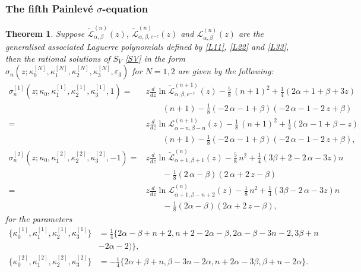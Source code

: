 \documentclass[12pt]{article}
\def\P{Painlev\'e }
\def\L{\mathcal{L}}
\newtheorem{mydef}{Theorem}[section]
\numberwithin{figure}{section}
\numberwithin{equation}{section}
\numberwithin{table}{section}
\begin{document}
\subsubsection{The fifth \P $\sigma$-equation}
\begin{mydef}
Suppose $\widetilde{\L}_{\alpha,\beta}^{(n)}(z)$, $\widetilde{\L}_{\alpha,\beta,e^{-z}}^{(n)}(z)$ and ${\L}_{\alpha,\beta}^{(n)}(z)$ are the generalised associated Laguerre polynomials defined by \eqref{L11}, \eqref{L22} and \eqref{L33}, then the rational solutions of $S_{V}$ \eqref{SV} in the form $\sigma_n(z;\kappa_0^{[N]},\kappa_1^{[N]},\kappa_2^{[N]},\kappa_3^{[N]},\varepsilon_3)$ for $N=1,2$ are given by the following:
\begin{subequations}
\begin{align}\nonumber
\sigma_n^{[1]}(z;\kappa_0,\kappa_1^{[1]},\kappa_2^{[1]},\kappa_3^{[1]},1)=&z\frac{d}{dz}\ln\mathcal{\widetilde L}_{\alpha,\beta,e^{-z}}^{(n+1)}(z)-\tfrac{5}{8}\,{(n+1)}^{2}+
\tfrac{1}{4}\left(2\alpha+1+\beta+3z\right)\\\nonumber&\qquad
(n+1)-\tfrac{1}{8}\left( -2\,\alpha-1+\beta \right)  \left( -2\,\alpha-1-2\,z+\beta\right)\\\nonumber
=&z\frac{d}{dz}\ln\mathcal{L}_{\alpha-n,\beta-n}^{(n+1)}(z)-\tfrac{1}{8}\,{(n+1)}^{2}+ \tfrac{1}{4}\left(2\alpha-1+\beta-z\right)\\\nonumber&\qquad
(n+1)-\tfrac{1}{8}\left( -2\,\alpha-1+\beta \right)  \left( -2\,\alpha-1-2\,z+\beta\right),\\\nonumber
\sigma_n^{[2]}(z;\kappa_0,\kappa_1^{[2]},\kappa_2^{[2]},\kappa_3^{[2]},-1)
=&z\frac{d}{dz}\ln\mathcal{\widetilde L}_{\alpha+1,\beta+1}^{(n)}(z)-\tfrac{5}{8}\,{n}^{2}+\tfrac{1}{4}\left(3\beta+2-2\,\alpha-3z\right) n\\\nonumber&\qquad
-\tfrac{1}{8}\left( 2\,\alpha-\beta \right)  \left( 2\,\alpha+2\,z-\beta\right)\\\nonumber
=&z\frac{d}{dz}\ln\mathcal{L}_{\alpha+1,\beta-n+2}^{(n)}(z)-\tfrac{1}{8}\,{n}^{2}+\tfrac{1}{4}\left(3\beta-2\,\alpha-3z \right)n\\\nonumber&\qquad
-\tfrac{1}{8}\left( 2\alpha-\beta \right)  \left( 2\alpha+2\,z-\beta\right),
\end{align}
\end{subequations}
for the parameters
\begin{subequations}
\begin{align}\nonumber
\{\kappa_0^{[1]},\kappa_1^{[1]},\kappa_2^{[1]},\kappa_3^{[1]}\}&=\tfrac{1}{4}\{2\alpha-\beta+n+2,n+2-2\alpha-\beta,2\alpha-\beta-3n-2,3\beta+n\\\qquad&-2\alpha-2)\},\\
\{\kappa_0^{[2]},\kappa_1^{[2]},\kappa_2^{[2]},\kappa_3^{[2]}\}&=-\tfrac{1}{4}\{2\alpha+\beta+n,\beta-3n-2\alpha,n+2\alpha-3\beta,\beta+n-2\alpha\}.
\end{align}
\end{subequations}
\end{mydef}
\end{document}
